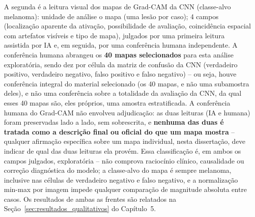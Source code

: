 A segunda é a leitura visual dos mapas de Grad-CAM da CNN (classe-alvo melanoma): unidade de análise o mapa (uma lesão por caso); 4 campos (localização aparente da ativação, possibilidade de avaliação, coincidência espacial com artefatos visíveis e tipo de mapa), julgados por uma primeira leitura assistida por IA e, em seguida, por uma conferência humana independente. A conferência humana abrangeu os \textbf{40 mapas selecionados} para esta análise exploratória, sendo dez por célula da matriz de confusão da CNN (verdadeiro positivo, verdadeiro negativo, falso positivo e falso negativo) -- ou seja, houve conferência integral do material selecionado (os 40 mapas, e não uma subamostra deles), e não uma conferência sobre a totalidade da avaliação da CNN, da qual esses 40 mapas são, eles próprios, uma amostra estratificada. A conferência humana do Grad-CAM não envolveu adjudicação: as duas leituras (IA e humana) foram preservadas lado a lado, sem sobrescrita, e \textbf{nenhuma das duas é tratada como a descrição final ou oficial do que um mapa mostra} -- qualquer afirmação específica sobre um mapa individual, nesta dissertação, deve indicar de qual das duas leituras ela provém. Essa classificação é, em ambos os campos julgados, exploratória -- não comprova raciocínio clínico, causalidade ou correção diagnóstica do modelo; a classe-alvo do mapa é sempre melanoma, inclusive nas células de verdadeiro negativo e falso negativo, e a normalização min-max por imagem impede qualquer comparação de magnitude absoluta entre casos. Os resultados de ambas as frentes são relatados na Seção~\ref{sec:resultados_qualitativos} do Capítulo~5.

